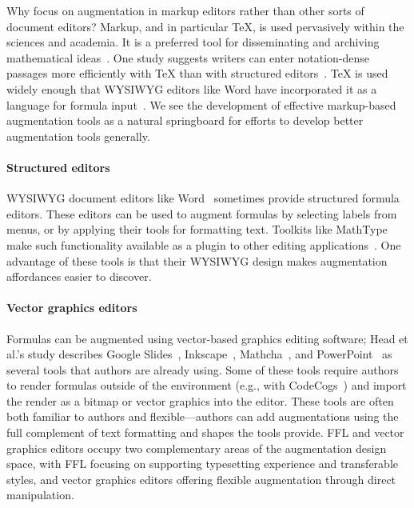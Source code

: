 Why focus on augmentation in markup editors rather than other sorts of document editors? Markup, and in particular TeX, is used pervasively within the sciences and academia. It is a preferred tool for disseminating and archiving mathematical ideas~\cite{ref:misfeldt2011computers}.
One study suggests writers can enter notation-dense passages more efficiently with TeX than with structured editors~\cite{ref:knauff2014efficiency}. TeX is used widely enough that WYSIWYG editors like Word have incorporated it as a language for formula input~\cite{ref:matthews2019craft}. We see the development of effective markup-based augmentation tools as a natural springboard for efforts to develop better augmentation tools generally.

\paragraph{Structured editors}

WYSIWYG document editors like Word~\cite{tool:wordformulaeditor} sometimes provide structured formula editors. These editors can be used to augment formulas by selecting labels from menus, or by applying their tools for formatting text. Toolkits like MathType make such functionality available as a plugin to other editing applications~\cite{ref:topping1999using}. One advantage of these tools is that their WYSIWYG design makes augmentation affordances easier to discover.

\paragraph{Vector graphics editors}

Formulas can be augmented using vector-based graphics editing software; Head et al.'s study describes Google Slides~\cite{tool:googleslides}, Inkscape~\cite{tool:inkscape}, Mathcha~\cite{tool:mathcha}, and PowerPoint~\cite{tool:powerpoint} as several tools that authors are already using. Some of these tools require authors to render formulas outside of the environment (e.g., with CodeCogs~\cite{tool:codecogs}) and import the render as a bitmap or vector graphics into the editor. These tools are often both familiar to authors and flexible---authors can add augmentations using the full complement of text formatting and shapes the tools provide.  FFL and vector graphics editors occupy two complementary areas of the augmentation design space, with FFL focusing on supporting typesetting experience and transferable styles, and vector graphics editors offering flexible augmentation through direct manipulation.


